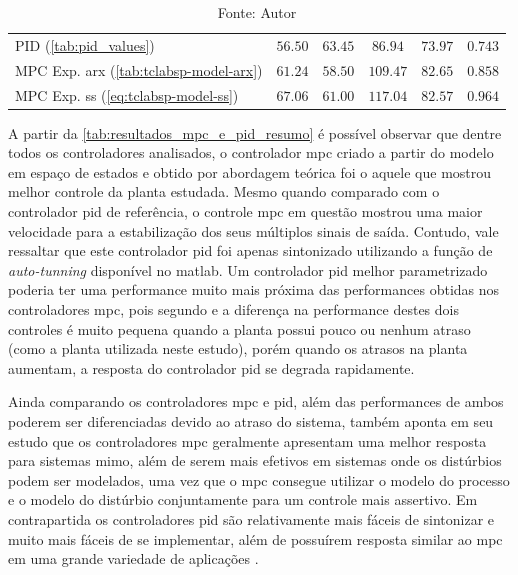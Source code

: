 \begin{table}[!h]
\begin{tabular}{l|cccc|c}
		PID (\cref{tab:pid_values})	                                        &   $56.50$           												&   $63.45$          											&   $86.94$          														&   $73.97$														&   $0.743$             														\\ 
		MPC Exp. \acrshort{arx}	(\cref{tab:tclabsp-model-arx})				&   $61.24$           												&   $58.50$          											&   $109.47$         														&   $82.65$														&   $0.858$             														\\ 
		MPC Exp. \acrshort{ss} (\cref{eq:tclabsp-model-ss})					&   $67.06$           												&   $61.00$          											&   $117.04$         														&   $82.57$														&   $0.964$             														\\ \bottomrule 
	\end{tabular}
	\caption*{Fonte: Autor}
\end{table}

\clearpage

A partir da \cref{tab:resultados_mpc_e_pid_resumo} é possível observar que dentre todos os controladores analisados,
o controlador \acrshort{mpc} criado a partir do modelo em espaço de estados e obtido por abordagem teórica
foi o aquele que mostrou melhor controle da planta estudada. Mesmo quando comparado com o controlador 
\acrshort{pid} de referência, o controle \acrshort{mpc} em questão mostrou uma maior velocidade para a estabilização
dos seus múltiplos sinais de saída. Contudo, vale ressaltar que este controlador \acrshort{pid} 
foi apenas sintonizado utilizando a função de \textit{auto-tunning} disponível no \acrshort{matlab}.
Um controlador \acrshort{pid} melhor parametrizado poderia ter uma performance muito mais próxima das 
performances obtidas nos controladores \acrshort{mpc}, pois segundo  e
 a diferença na performance destes dois controles é muito pequena quando
a planta possui pouco ou nenhum atraso (como a planta utilizada neste estudo), porém quando os atrasos
na planta aumentam, a resposta do controlador \acrshort{pid} se degrada rapidamente.

Ainda comparando os controladores \acrshort{mpc} e \acrshort{pid}, além das performances de ambos poderem ser
diferenciadas devido ao atraso do sistema,  também aponta em seu estudo que os
controladores \acrshort{mpc} geralmente apresentam uma melhor resposta para sistemas \acrshort{mimo},
além de serem mais efetivos em sistemas onde os distúrbios podem ser modelados, uma vez que o
\acrshort{mpc} consegue utilizar o modelo do processo e o modelo do distúrbio conjuntamente para um 
controle mais assertivo. Em contrapartida os controladores \acrshort{pid} são relativamente mais
fáceis de sintonizar e muito mais fáceis de se implementar, além de possuírem resposta similar ao \acrshort{mpc}
em uma grande variedade de aplicações \cite{Taysom2017}.

